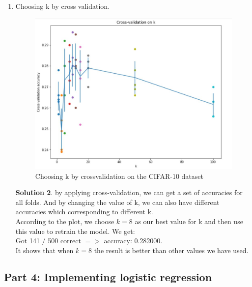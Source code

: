 \documentclass[]{book}
\theoremstyle{definition}
\newtheorem*{soln}{Solution}
\begin{document}
\begin{enumerate}
\begin{soln}
		The result is same compared to the former methods. We can compare how fast the implementations are. The result is that:\\
		Two loop version took 884.739000 seconds\\
		One loop version took 104.597000 seconds\\
		No loop version took 12.769000 seconds
	\end{soln}
	\item Choosing k by cross validation.
	\begin{figure}[h]
			\centering
			\includegraphics[width=11cm]{knn.jpg}
			\caption{Choosing k by crossvalidation on the CIFAR-10 dataset}
			\label{fig：1}
	\end{figure}
	\begin{soln}
		by applying cross-validation, we can get a set of accuracies for all folds. And by changing the value of k, we can also have different accuracies which corresponding to different k.\\
		According to the plot, we choose $k=8$ as our best value for k and then use this value to retrain the model. We get:\\
		Got 141 $/$ 500 correct $=>$ accuracy: 0.282000. \\It shows that when $k = 8 $ the result is better than other values we have used. 
	\end{soln}
\end{enumerate}

\subsection*{Part 4: Implementing logistic regression}
\end{document}
